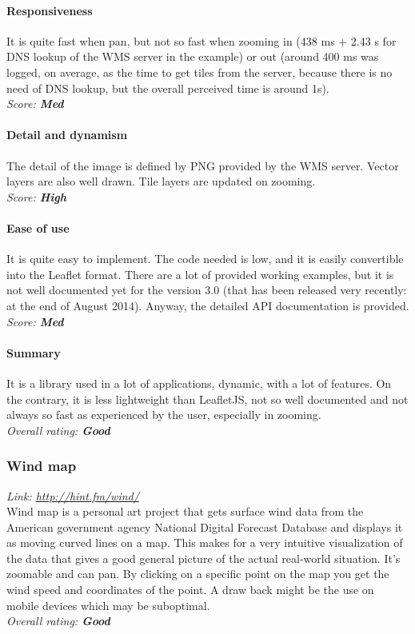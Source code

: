 \documentclass[11pt,a4paper,titlepage,oneside]{report}
\begin{document}
   \paragraph{Responsiveness}
   It is quite fast when pan, but not so fast when zooming in (438 ms + 2.43 s for DNS lookup of the \gls{WMS} server in the example) or out (around 400 ms was logged, on average, as the time to get tiles from the server, because there is no need of DNS lookup, but the overall perceived time is around 1s).
   \\ \emph{Score: \textbf{Med}}
   \paragraph{Detail and dynamism}
   The detail of the image is defined by \gls{PNG} provided by the \gls{WMS} server. Vector layers are also well drawn. Tile layers are updated on zooming.
   \\ \emph{Score: \textbf{High}}
   \paragraph{Ease of use}
   It is quite easy to implement. The code needed is low, and it is easily convertible into the Leaflet format. There are a lot of provided working examples, but it is not well documented yet for the version 3.0 (that has been released very recently: at the end of August 2014). Anyway, the detailed \gls{API} documentation is provided.
   \\ \emph{Score: \textbf{Med}}
   \paragraph{Summary}
   It is a library used in a lot of applications, dynamic, with a lot of features. On the contrary, it is less lightweight than LeafletJS, not so well documented and not always so fast as experienced by the user, especially in zooming.
   \\ \emph{Overall rating: \textbf{Good}}
  
  \subsubsection{Wind map}
  \emph{Link: \url{http://hint.fm/wind/}} \\%
    Wind map is a personal art project that gets surface wind data from the American government agency National Digital Forecast Database and displays it as moving curved lines on a map. This makes for a very intuitive visualization of the data that gives a good general picture of the actual real-world situation. It's zoomable and can pan. By clicking on a specific point on the map you get the wind speed and coordinates of the point. A draw back might be the use on mobile devices which may be suboptimal.
  \\ \emph{Overall rating: \textbf{Good}}
\end{document}
